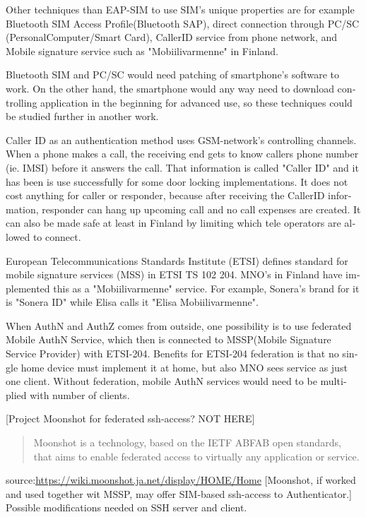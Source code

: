 \documentclass[12pt,a4paper,english]{tutthesis}
\begin{document}
\begin{otherlanguage}{english}
Other techniques than EAP-SIM to use SIM's unique properties
are for example 
Bluetooth SIM Access Profile(Bluetooth  SAP), 
direct connection through PC/SC (Personal\-Computer/Smart\- Card),
CallerID service from phone network, and
Mobile signature service such as "Mobiilivarmenne" in Finland.



Bluetooth SIM and PC/SC would need patching of smartphone's software
to work.  On the other hand, the smartphone would any way need to
download controlling application
in the beginning for advanced use, so these techniques could be
studied further in another work.

Caller ID as an authentication method uses GSM-network's controlling
channels. When a phone makes a call, the receiving end gets 
to know callers phone number (ie. IMSI) before it answers the call.
That information is called "Caller ID" and it has been is use
successfully for some door locking implementations. 
It does not cost anything for caller or responder,
because after receiving the CallerID  information, responder can hang
up upcoming call and no call expenses are created.
 It can also be made safe at least in Finland
by limiting which tele operators are allowed to connect.
















European Telecommunications Standards Institute (ETSI) defines
standard for mobile signature services (MSS) in ETSI TS 102 204.
MNO's in Finland have implemented this as a "Mobiilivarmenne"
service. 
For example, Sonera's brand for  it is "Sonera ID" while Elisa calls it
"Elisa Mobiilivarmenne".

When AuthN and AuthZ comes from outside, one possibility is to use
federated Mobile AuthN Service, which then is connected to MSSP(Mobile
Signature Service Provider) with ETSI-204. Benefits for ETSI-204
federation is that no single home device must implement it at home,
but also MNO sees service as just one client.  Without federation,
mobile AuthN services would need to be multiplied with number of
clients.


[Project Moonshot for federated ssh-access? NOT HERE]
\begin{quote}
Moonshot is a technology, based on the IETF ABFAB open standards, that aims to enable federated access to virtually any application or service.
\end{quote}
source:\url{https://wiki.moonshot.ja.net/display/HOME/Home}
[Moonshot, if worked and used together wit MSSP, may offer SIM-based
ssh-access to Authenticator.] Possible modifications needed on SSH
server and client.


\end{otherlanguage}
\end{document}

